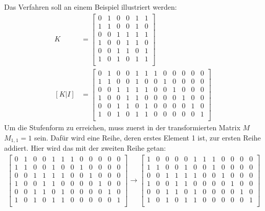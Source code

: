 \documentclass[a4paper,10pt,ngerman]{scrartcl}
\begin{document}
Das Verfahren soll an einem Beispiel illustriert werden:
\begin{align*}
K &= \left[ \begin{array}{cccccc}
0 & 1 & 0 & 0 & 1 & 1 \\
1 & 1 & 0 & 0 & 1 & 0 \\
0 & 0 & 1 & 1 & 1 & 1 \\
1 & 0 & 0 & 1 & 1 & 0 \\
0 & 0 & 1 & 1 & 0 & 1 \\
1 & 0 & 1 & 0 & 1 & 1 \\
\end{array} \right] \\
[K | I] &= \left[ \begin{array}{cccccc|cccccc}
0 & 1 & 0 & 0 & 1 & 1 & 1 & 0 & 0 & 0 & 0 & 0 \\
1 & 1 & 0 & 0 & 1 & 0 & 0 & 1 & 0 & 0 & 0 & 0 \\
0 & 0 & 1 & 1 & 1 & 1 & 0 & 0 & 1 & 0 & 0 & 0 \\
1 & 0 & 0 & 1 & 1 & 0 & 0 & 0 & 0 & 1 & 0 & 0 \\
0 & 0 & 1 & 1 & 0 & 1 & 0 & 0 & 0 & 0 & 1 & 0 \\
1 & 0 & 1 & 0 & 1 & 1 & 0 & 0 & 0 & 0 & 0 & 1 \\
\end{array} \right]
\end{align*} 
Um die Stufenform zu erreichen, muss zuerst in der transformierten Matrix $M$ $M_{1,1} = 1$ sein. Dafür wird eine Reihe, deren erstes Element 1 ist, zur ersten Reihe addiert. Hier wird das mit der zweiten Reihe getan:
\begin{align*}
\left[ \begin{array}{cccccc|cccccc}
0 & 1 & 0 & 0 & 1 & 1 & 1 & 0 & 0 & 0 & 0 & 0 \\
1 & 1 & 0 & 0 & 1 & 0 & 0 & 1 & 0 & 0 & 0 & 0 \\
0 & 0 & 1 & 1 & 1 & 1 & 0 & 0 & 1 & 0 & 0 & 0 \\
1 & 0 & 0 & 1 & 1 & 0 & 0 & 0 & 0 & 1 & 0 & 0 \\
0 & 0 & 1 & 1 & 0 & 1 & 0 & 0 & 0 & 0 & 1 & 0 \\
1 & 0 & 1 & 0 & 1 & 1 & 0 & 0 & 0 & 0 & 0 & 1 \\
\end{array} \right] 
\rightarrow \left[ \begin{array}{cccccc|cccccc}
1 & 0 & 0 & 0 & 0 & 1 & 1 & 1 & 0 & 0 & 0 & 0 \\
1 & 1 & 0 & 0 & 1 & 0 & 0 & 1 & 0 & 0 & 0 & 0 \\
0 & 0 & 1 & 1 & 1 & 1 & 0 & 0 & 1 & 0 & 0 & 0 \\
1 & 0 & 0 & 1 & 1 & 0 & 0 & 0 & 0 & 1 & 0 & 0 \\
0 & 0 & 1 & 1 & 0 & 1 & 0 & 0 & 0 & 0 & 1 & 0 \\
1 & 0 & 1 & 0 & 1 & 1 & 0 & 0 & 0 & 0 & 0 & 1 \\
\end{array} \right]
\end{align*}
\end{document}
